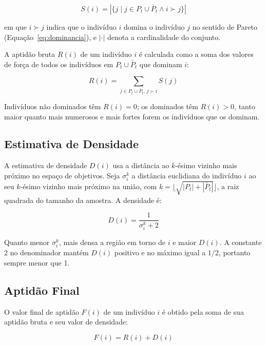 \begin{equation}
\label{eq:strength_value}
S(i) = |\{j \mid j \in P_t \cup \bar{P}_t \land i \succ j\}|
\end{equation}

\noindent em que $i \succ j$ indica que o indivíduo $i$ domina o indivíduo $j$ no sentido de Pareto (Equação~\ref{eq:dominancia}), e $|\cdot|$ denota a cardinalidade do conjunto.

A aptidão bruta $R(i)$ de um indivíduo $i$ é calculada como a soma dos valores de força de todos os indivíduos em $P_t \cup \bar{P}_t$ que dominam $i$:

\begin{equation}
\label{eq:raw_fitness}
R(i) = \sum_{j \in P_t \cup \bar{P}_t, \, j \succ i} S(j)
\end{equation}

Indivíduos não dominados têm $R(i) = 0$; os dominados têm $R(i) > 0$, tanto maior quanto mais numerosos e mais fortes forem os indivíduos que os dominam.

\subsection{Estimativa de Densidade}

A estimativa de densidade $D(i)$ usa a distância ao $k$-ésimo vizinho mais próximo no espaço de objetivos. Seja $\sigma_i^k$ a distância euclidiana do indivíduo $i$ ao seu $k$-ésimo vizinho mais próximo na união, com $k = \lfloor\sqrt{|P_t| + |\bar{P}_t|}\rfloor$, a raiz quadrada do tamanho da amostra. A densidade é:

\begin{equation}
\label{eq:density_estimation}
D(i) = \frac{1}{\sigma_i^k + 2}
\end{equation}

Quanto menor $\sigma_i^k$, mais densa a região em torno de $i$ e maior $D(i)$. A constante 2 no denominador mantém $D(i)$ positivo e no máximo igual a $1/2$, portanto sempre menor que 1.

\subsection{Aptidão Final}

O valor final de aptidão $F(i)$ de um indivíduo $i$ é obtido pela soma de sua aptidão bruta e seu valor de densidade:

\begin{equation}
\label{eq:final_fitness}
F(i) = R(i) + D(i)
\end{equation}

